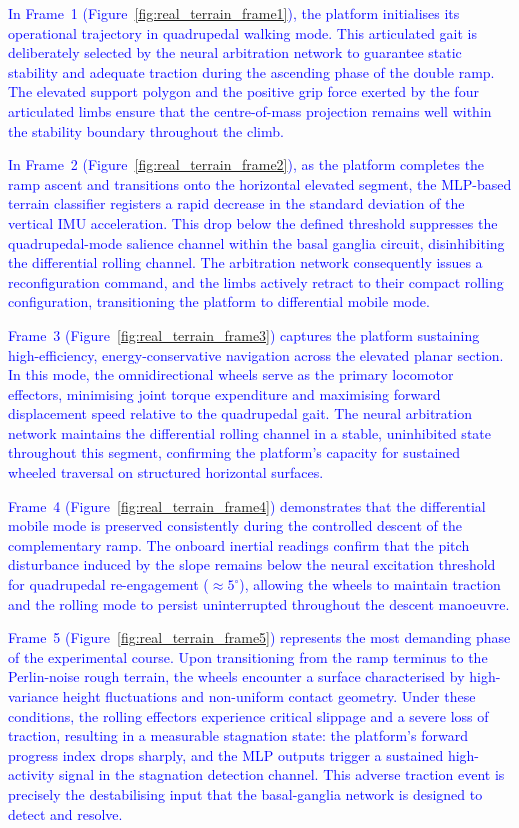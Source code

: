 \documentclass[preprint,12pt]{elsarticle}
\newcommand{\revblue}[1]{\textcolor{blue}{#1}}
\begin{document}
\revblue{In Frame~1 (Figure~}\ref{fig:real_terrain_frame1}\revblue{), the platform initialises its operational trajectory in quadrupedal walking mode. This articulated gait is deliberately selected by the neural arbitration network to guarantee static stability and adequate traction during the ascending phase of the double ramp. The elevated support polygon and the positive grip force exerted by the four articulated limbs ensure that the centre-of-mass projection remains well within the stability boundary throughout the climb.}

\revblue{In Frame~2 (Figure~}\ref{fig:real_terrain_frame2}\revblue{), as the platform completes the ramp ascent and transitions onto the horizontal elevated segment, the MLP-based terrain classifier registers a rapid decrease in the standard deviation of the vertical IMU acceleration. This drop below the defined threshold suppresses the quadrupedal-mode salience channel within the basal ganglia circuit, disinhibiting the differential rolling channel. The arbitration network consequently issues a reconfiguration command, and the limbs actively retract to their compact rolling configuration, transitioning the platform to differential mobile mode.}

\revblue{Frame~3 (Figure~}\ref{fig:real_terrain_frame3}\revblue{) captures the platform sustaining high-efficiency, energy-conservative navigation across the elevated planar section. In this mode, the omnidirectional wheels serve as the primary locomotor effectors, minimising joint torque expenditure and maximising forward displacement speed relative to the quadrupedal gait. The neural arbitration network maintains the differential rolling channel in a stable, uninhibited state throughout this segment, confirming the platform's capacity for sustained wheeled traversal on structured horizontal surfaces.}

\revblue{Frame~4 (Figure~}\ref{fig:real_terrain_frame4}\revblue{) demonstrates that the differential mobile mode is preserved consistently during the controlled descent of the complementary ramp. The onboard inertial readings confirm that the pitch disturbance induced by the slope remains below the neural excitation threshold for quadrupedal re-engagement (${\approx}5^{\circ}$), allowing the wheels to maintain traction and the rolling mode to persist uninterrupted throughout the descent manoeuvre.}

\revblue{Frame~5 (Figure~}\ref{fig:real_terrain_frame5}\revblue{) represents the most demanding phase of the experimental course. Upon transitioning from the ramp terminus to the Perlin-noise rough terrain, the wheels encounter a surface characterised by high-variance height fluctuations and non-uniform contact geometry. Under these conditions, the rolling effectors experience critical slippage and a severe loss of traction, resulting in a measurable stagnation state: the platform's forward progress index drops sharply, and the MLP outputs trigger a sustained high-activity signal in the stagnation detection channel. This adverse traction event is precisely the destabilising input that the basal-ganglia network is designed to detect and resolve.}
\end{document}
